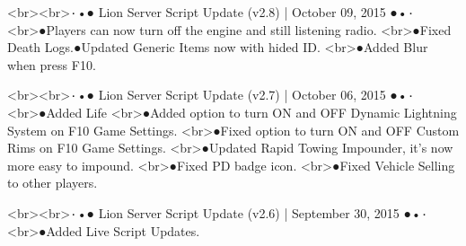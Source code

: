 		<br><br>۰•● Lion Server Script Update (v2.8) | October 09, 2015 ●•۰
		<br>●Players can now turn off the engine and still listening radio.
		<br>●Fixed Death Logs.\n●Updated Generic Items now with hided ID.
		<br>●Added Blur when press F10.

		<br><br>۰•● Lion Server Script Update (v2.7) | October 06, 2015 ●•۰
		<br>●Added Life %
		<br>●Added option to turn ON and OFF Dynamic Lightning System on F10 Game Settings.
		<br>●Fixed option to turn ON and OFF Custom Rims on F10 Game Settings.
		<br>●Updated Rapid Towing Impounder, it's now more easy to impound.
		<br>●Fixed PD badge icon.
		<br>●Fixed Vehicle Selling to other players.

		<br><br>۰•● Lion Server Script Update (v2.6) | September 30, 2015 ●•۰
		<br>●Added Live Script Updates.

